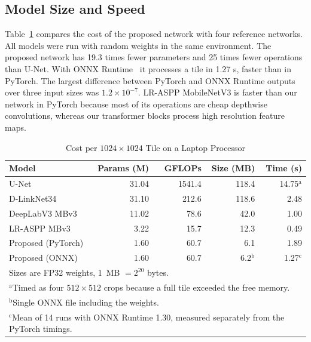 \documentclass{ieeeaccess}
\begin{document}
\subsection{Model Size and Speed}

Table~\ref{tab:cost} compares the cost of the proposed network with four reference networks. All models were run with random weights in the same environment. The proposed network has 19.3 times fewer parameters and 25 times fewer operations than U-Net. With ONNX Runtime~\cite{onnxruntime} it processes a tile in 1.27 s, faster than in PyTorch. The largest difference between PyTorch and ONNX Runtime outputs over three input sizes was $1.2 \times 10^{-7}$. LR-ASPP MobileNetV3 is faster than our network in PyTorch because most of its operations are cheap depthwise convolutions, whereas our transformer blocks process high resolution feature maps.

\begin{table}[t]
\caption{Cost per $1024 \times 1024$ Tile on a Laptop Processor}
\label{tab:cost}
\setlength{\tabcolsep}{3pt}
\tablebodyfont
\begin{tabular}{|p{72pt}|r|r|r|r|}
\hline
Model & Params (M) & GFLOPs & Size (MB) & Time (s) \\
\hline
U-Net~\cite{ronneberger2015unet} & 31.04 & 1541.4 & 118.4 & 14.75$^{\mathrm{a}}$ \\
D-LinkNet34~\cite{zhou2018dlinknet} & 31.10 & 212.6 & 118.6 & 2.48 \\
DeepLabV3 MBv3~\cite{chen2017deeplab} & 11.02 & 78.6 & 42.0 & 1.00 \\
LR-ASPP MBv3~\cite{howard2019mobilenetv3} & 3.22 & 15.7 & 12.3 & 0.49 \\
Proposed (PyTorch) & 1.60 & 60.7 & 6.1 & 1.89 \\
Proposed (ONNX) & 1.60 & 60.7 & 6.2$^{\mathrm{b}}$ & 1.27$^{\mathrm{c}}$ \\
\hline
\multicolumn{5}{p{230pt}}{Sizes are FP32 weights, 1~MB $= 2^{20}$ bytes.}\\
\multicolumn{5}{p{230pt}}{$^{\mathrm{a}}$Timed as four $512 \times 512$ crops because a full tile exceeded the free memory.}\\
\multicolumn{5}{p{230pt}}{$^{\mathrm{b}}$Single ONNX file including the weights.}\\
\multicolumn{5}{p{230pt}}{$^{\mathrm{c}}$Mean of 14 runs with ONNX Runtime 1.30, measured separately from the PyTorch timings.}
\end{tabular}
\end{table}
\end{document}
